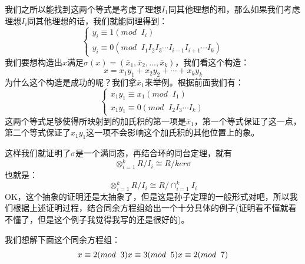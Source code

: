 \documentclass[12pt, a4paper, oneside]{ctexart}
\begin{document}
我们之所以能找到这两个等式是考虑了理想$I_1$同其他理想的和，那么如果我们考虑理想$I_i$同其他理想的话，我们就能同理得到：
\[
\begin{cases}
y_i\equiv 1(mod\;\; I_i)\\
y_i\equiv 0(mod\;\; I_1I_2I_3\cdots I_{i-1}I_{i+1}\cdots I_k )
\end{cases}
\]
我们要想构造出$x$满足$\sigma(x)=(\overline{x}_1,\overline{x}_2,...,\overline{x}_k)$，我们看这个构造：
\[
x=x_1y_1+x_2y_2+\cdots+x_ky_k
\]
为什么这个构造是成功的呢？我们拿$\overline{x}_1$来举例。根据前面我们有：
\[
\begin{cases}
x_1y_1\equiv x_1(mod\;\; I_1)\\
x_1y_1\equiv 0(mod\;\; I_2I_3\cdots I_k )
\end{cases}
\]
这两个等式足够使得所映射到的加氏积的第一项是$\overline{x}_1$，第一个等式保证了这一点，第二个等式保证了$x_1y_1$这一项不会影响这个加氏积的其他位置上的象。

这样我们就证明了$\sigma$是一个满同态，再结合环的同台定理，就有
\[
\otimes_{i=1}^kR/I_i\cong R/ker\sigma
\]
也就是：
\[
\otimes_{i=1}^kR/I_i\cong R/\cap_{i=1}^k I_i
\]
OK，这个抽象的证明还是太抽象了，但是这是孙子定理的一般形式对吧，所以我们根据上述证明过程，结合同余方程组给出一个十分具体的例子(证明看不懂就看不懂了，但是这个例子我觉得我写的还是很好的)。

我们想解下面这个同余方程组：
\[
x\equiv 2(mod \;\; 3)\\
x\equiv 3(mod \;\; 5)\\
x\equiv 2(mod \;\; 7)
\]
\end{document}
